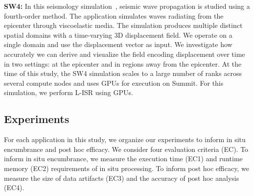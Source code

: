 \textbf{SW4:} In this seismology simulation~\cite{petersson2015wave}, seismic wave propagation is studied using a fourth-order method.
%
The application simulates waves radiating from the epicenter through viscoelastic media. 
%
The simulation produces multiple distinct spatial domains with a time-varying 3D displacement field.
%
We operate on a single domain and use the displacement vector as input.
%
We investigate how accurately we can derive and visualize the field encoding displacement over time in two settings: at the epicenter and in regions away from the epicenter.
%
At the time of this study, the SW4 simulation scales to a large number of ranks across several compute nodes and uses GPUs for execution on Summit.
%
For this simulation, we perform L-ISR using GPUs.
%

%

%
\subsection{Experiments}
\label{sec:experiments}

For each application in this study, we organize our experiments to inform in situ encumbrance and post hoc efficacy. 
%
We consider four evaluation criteria (EC).
%
To inform in situ encumbrance,  we measure the execution time (EC1) and runtime memory (EC2) requirements of in situ processing.
%
To inform post hoc efficacy, we measure the size of data artifacts (EC3) and the accuracy of post hoc analysis (EC4).

